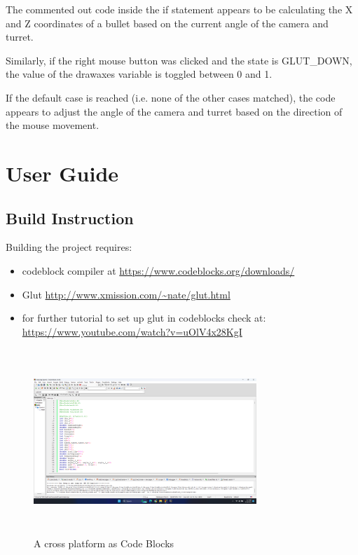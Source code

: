 \documentclass[12pt,a4]{article}
\begin{document}
{The commented out code inside the if statement appears to be calculating the X and Z coordinates of a bullet based on the current angle of the camera and turret.

Similarly, if the right mouse button was clicked and the state is GLUT\_DOWN, the value of the drawaxes variable is toggled between 0 and 1.

If the default case is reached (i.e. none of the other cases matched), the code appears to adjust the angle of the camera and turret based on the direction of the mouse movement.
\section{\Huge{User Guide}}
\subsection{\Large{Build Instruction}}
Building the project requires:\\
\begin{itemize}
    \item codeblock compiler at \url{https://www.codeblocks.org/downloads/}\\
    \item Glut \url{http://www.xmission.com/~nate/glut.html}\\
    \item for further tutorial to set up glut in codeblocks check at: \url{https://www.youtube.com/watch?v=uOlV4x28KgI}\\
    \end{itemize} 
    \begin{figure}
        \centering
        \includegraphics[width=0.75\textwidth, height=7cm]{Screenshot (63).png}
        \caption{A cross platform as Code Blocks}
        \label{fig:my_label}
    \end{figure}

}
\end{document}
